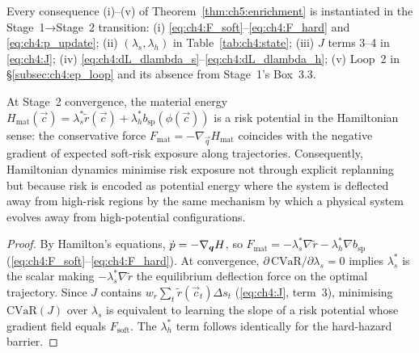 \begin{corollary}
\label{cor:ch5:concrete}
Every consequence (i)--(v) of Theorem~\ref{thm:ch5:enrichment}
is instantiated in the Stage~1→Stage~2 transition:
(i) \eqref{eq:ch4:F_soft}--\eqref{eq:ch4:F_hard} and
\eqref{eq:ch4:p_update};
(ii) $(\lambda_s,\lambda_h)$ in Table~\ref{tab:ch4:state};
(iii) $J$ terms 3--4 in \eqref{eq:ch4:J};
(iv) \eqref{eq:ch4:dL_dlambda_s}--\eqref{eq:ch4:dL_dlambda_h};
(v) Loop~2 in §\ref{subsec:ch4:ep_loop} and its absence from
    Stage~1's Box~3.3.
\end{corollary}

\begin{proposition}
\label{prop:ch5:risk_duality}
At Stage~2 convergence, the material energy
$H_{\mathrm{mat}}(\vec{c})
 = \lambda_s^*\tilde{r}(\vec{c})
 + \lambda_h^*b_{\mathrm{sp}}(\phi(\vec{c}))$
is a risk potential in the Hamiltonian sense:
the conservative force
$F_{\mathrm{mat}} = -\nabla_{\vec{q}}H_{\mathrm{mat}}$
coincides with the negative gradient of expected soft-risk exposure
along trajectories.
Consequently, Hamiltonian dynamics minimise risk exposure not through
explicit replanning but because risk is encoded as potential energy where
the system is deflected away from high-risk regions by the same
mechanism by which a physical system evolves away from
high-potential configurations.
\end{proposition}
\begin{proof}
By Hamilton's equations,
$\dot{p}=-\nabla_{\boldsymbol{q}}H$, so
$F_{\mathrm{mat}}
 = -\lambda_s^*\nabla\tilde{r}
 - \lambda_h^*\nabla b_{\mathrm{sp}}$
(\eqref{eq:ch4:F_soft}--\eqref{eq:ch4:F_hard}).
At convergence, $\partial\,\mathrm{CVaR}/\partial\lambda_s=0$ implies
$\lambda_s^*$ is the scalar making $-\lambda_s^*\nabla\tilde{r}$
the equilibrium deflection force on the optimal trajectory.
Since $J$ contains $w_r\sum_t\tilde{r}(\vec{c}_t)\Delta s_t$
(\eqref{eq:ch4:J}, term~3), minimising $\mathrm{CVaR}(J)$ over
$\lambda_s$ is equivalent to learning the slope of a risk potential
whose gradient field equals $F_{\mathrm{soft}}$.
The $\lambda_h^*$ term follows identically for the hard-hazard barrier.
\end{proof}

